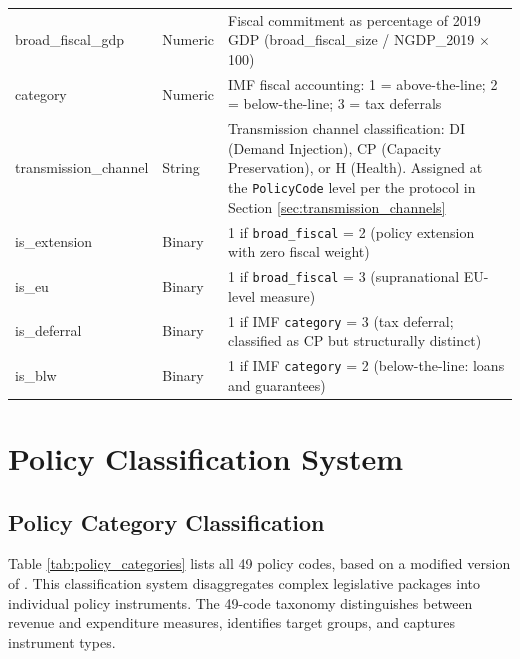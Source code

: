 \documentclass[12pt]{article}
\begin{document}
\begin{table}[H]
\begin{threeparttable}
\begin{tabular}{@{}p{3cm}p{2cm}p{12cm}@{}}
\addlinespace
broad\_fiscal\_gdp & Numeric & Fiscal commitment as percentage of 2019 GDP (broad\_fiscal\_size / NGDP\_2019 $\times$ 100) \\
\addlinespace
category & Numeric & IMF fiscal accounting: 1 = above-the-line; 2 = below-the-line; 3 = tax deferrals \\
\addlinespace
transmission\_channel & String & Transmission channel classification: DI (Demand Injection), CP (Capacity Preservation), or H (Health). Assigned at the \texttt{PolicyCode} level per the protocol in Section \ref{sec:transmission_channels} \\
\addlinespace
is\_extension & Binary & 1 if \texttt{broad\_fiscal} = 2 (policy extension with zero fiscal weight) \\
\addlinespace
is\_eu & Binary & 1 if \texttt{broad\_fiscal} = 3 (supranational EU-level measure) \\
\addlinespace
is\_deferral & Binary & 1 if IMF \texttt{category} = 3 (tax deferral; classified as CP but structurally distinct) \\
\addlinespace
is\_blw & Binary & 1 if IMF \texttt{category} = 2 (below-the-line: loans and guarantees) \\
\bottomrule
\end{tabular}
\end{threeparttable}
\end{table}

\newpage
\section{Policy Classification System}
\label{sec:policy_classification}

\subsection{Policy Category Classification}

Table \ref{tab:policy_categories} lists all 49 policy codes, based on a modified version of \citep{LaceyMassadUtz2021}. This classification system disaggregates complex legislative packages into individual policy instruments. The 49-code taxonomy distinguishes between revenue and expenditure measures, identifies target groups, and captures instrument types.
\end{document}
